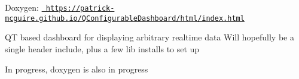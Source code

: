 \label{index_md_QConfigurableDashboard_README}%
%
Doxygen\+: \href{https://patrick-mcguire.github.io/QConfigurableDashboard/html/index.html}{\texttt{ https\+://patrick-\/mcguire.\+github.\+io/\+QConfigurable\+Dashboard/html/index.\+html}}

QT based dashboard for displaying arbitrary realtime data Will hopefully be a single header include, plus a few lib installs to set up

In progress, doxygen is also in progress 